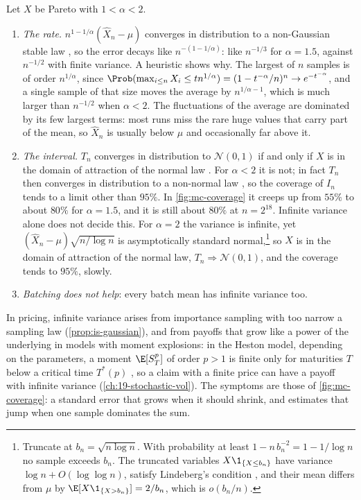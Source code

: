 \begin{remark}\label{rem:mc-heavy-tails}
Let $X$ be Pareto with $1<\alpha<2$.
\begin{enumerate}[label=(\alph*)]
  \item \emph{The rate.} $n^{1-1/\alpha}(\hat X_n-\mu)$ converges in distribution to a
    non-Gaussian stable law \citep[Section~3.8]{durrett}, so the error decays like
    $n^{-(1-1/\alpha)}$: like $n^{-1/3}$ for $\alpha=1.5$, against $n^{-1/2}$ with finite
    variance. A heuristic shows why. The largest of $n$ samples is of order $n^{1/\alpha}$,
    since $\Prob(\max_{i\le n}X_i\le tn^{1/\alpha})=(1-t^{-\alpha}/n)^n\to e^{-t^{-\alpha}}$,
    and a single sample of that size moves the average by $n^{1/\alpha-1}$, which is much
    larger than $n^{-1/2}$ when $\alpha<2$. The fluctuations of the average are dominated
    by its few largest terms: most runs miss the rare huge values that carry part of the
    mean, so $\hat X_n$ is usually below $\mu$ and occasionally far above it.
  \item \emph{The interval.} $T_n$ converges in distribution to $\mathcal N(0,1)$ if and
    only if $X$ is in the domain of attraction of the normal law \citep{gine-gotze-mason}.
    For $\alpha<2$ it is not; in fact $T_n$ then converges in distribution to a non-normal
    law \citep{logan-mallows-rice-shepp}, so the coverage of $I_n$ tends to a limit other
    than $95\%$. In \cref{fig:mc-coverage} it creeps up from $55\%$ to about $80\%$ for
    $\alpha=1.5$, and it is still about $80\%$ at $n=2^{18}$. Infinite variance alone does not decide this.
    For $\alpha=2$ the variance is infinite, yet $(\hat X_n-\mu)\sqrt{n/\log n}$ is
    asymptotically standard normal,\footnote{Truncate at $b_n=\sqrt{n\log n}$. With
    probability at least $1-n\,b_n^{-2}=1-1/\log n$ no sample exceeds $b_n$. The truncated
    variables $X\1_{\{X\le b_n\}}$ have variance $\log n+O(\log\log n)$, satisfy
    Lindeberg's condition \citep[Section~3.4.2]{durrett}, and their mean differs from $\mu$
    by $\E[X\1_{\{X>b_n\}}]=2/b_n$, which is $o(b_n/n)$.} so $X$ is in the domain of
    attraction of the normal law, $T_n\Rightarrow\mathcal N(0,1)$, and the coverage tends to
    $95\%$, slowly.
  \item \emph{Batching does not help}: every batch mean has infinite variance too.
\end{enumerate}
In pricing, infinite variance arises from importance sampling with too narrow a sampling
law (\cref{prop:is-gaussian}), and from payoffs that grow like a power of the underlying in
models with moment explosions: in the Heston model, depending on the parameters, a moment
$\E[S_T^p]$ of order $p>1$ is finite only for maturities $T$ below a critical time
$T^*(p)$ \citep{andersen-piterbarg}, so a claim with a finite
price can have a payoff with infinite variance (\cref{ch:19-stochastic-vol}). The symptoms
are those of \cref{fig:mc-coverage}: a standard error that grows when it should shrink, and
estimates that jump when one sample dominates the sum.
\end{remark}

